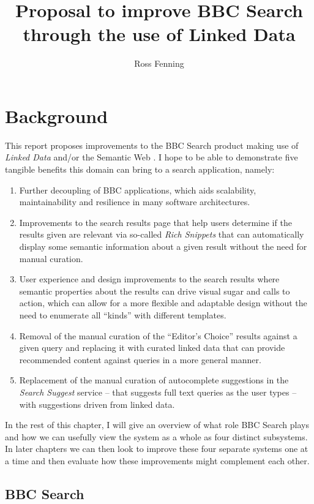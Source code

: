 \documentclass[10pt,a4paper]{report}
\title{Proposal to improve BBC Search through the use of Linked Data}
\author{Ross Fenning}
\begin{document}
\maketitle

\chapter{Background}

This report proposes improvements to the BBC Search product making use
of \emph{Linked Data} \cite{} and/or the Semantic Web \cite{}. I hope
to be able to demonstrate five tangible benefits this domain can
bring to a search application, namely:

\begin{enumerate}
  \item Further decoupling of BBC applications, which aids scalability,
    maintainability and resilience in many software architectures. \cite{}
  \item Improvements to the search results page that help users determine
    if the results given are relevant via so-called \emph{Rich Snippets}
    that can automatically display some semantic information about a given
    result without the need for manual curation.
  \item User experience and design improvements to the search results
    where semantic properties about the results can drive visual sugar
    and calls to action, which can allow for a more flexible and
    adaptable design without the need to enumerate all ``kinds'' with
    different templates.
  \item Removal of the manual curation of the ``Editor's Choice'' results
    against a given query and replacing it with curated linked data that
    can provide recommended content against queries in a more general
    manner.
  \item Replacement of the manual curation of autocomplete suggestions
    in the \emph{Search Suggest} service -- that suggests full text queries
    as the user types -- with suggestions driven from linked data.
\end{enumerate}

In the rest of this chapter, I will give an overview of what role BBC
Search plays and how we can usefully view the system as a whole as four
distinct subsystems. In later chapters we can then look to improve these
four separate systems one at a time and then evaluate how these improvements
might complement each other.

\section{BBC Search}
\end{document}
